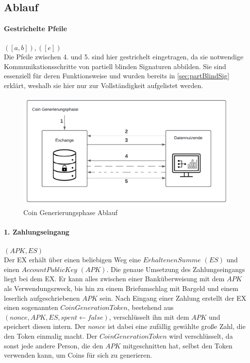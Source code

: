 \documentclass[
	fontsize=11pt,
	headings=small,
	parskip=half,           %
	bibliography=totoc,
	numbers=noenddot,       %
	open=any,               %
]{scrreprt}
\begin{document}
\subsection{Ablauf}

\paragraph*{Gestrichelte Pfeile} $([a,b]), ([e])$\\
Die Pfeile zwischen 4. und 5. sind hier gestrichelt eingetragen, da sie notwendige Kommunikationsschritte von partiell blinden Signaturen abbilden. Sie sind essenziell für deren Funktionsweise und wurden bereits in \ref{sec:partBlindSig} erklärt, weshalb sie hier nur zur Vollständigkeit aufgelistet werden.

\begin{figure}[H]
    \centering
    \includegraphics[width=0.7\linewidth]{CoinGenerationPhaseDiagramm.pdf}
    \caption{Coin Generierungsphase Ablauf}
    \label{fig:coin-generationphase}
\end{figure}

\paragraph{1. Zahlungseingang} $(APK, ES)$\\
Der EX erhält über einen beliebigen Weg eine $ErhaltenenSumme$ $(ES)$ und einen $AccountPublicKey$ $(APK)$. Die genaue Umsetzung des Zahlungseingangs liegt bei dem EX. Er kann alles zwischen einer Banküberweisung mit dem $APK$ als Verwendungszweck, bis hin zu einem Briefumschlag mit Bargeld und einem leserlich aufgeschriebenen $APK$ sein. Nach Eingang einer Zahlung erstellt der EX einen sogenannten $CoinGenerationToken$, bestehend aus $(nonce, APK, ES, spent \leftarrow false)$, verschlüsselt ihn mit dem $APK$ und speichert diesen intern. Der $nonce$ ist dabei eine zufällig gewählte große Zahl, die den Token einmalig macht. Der $CoinGenerationToken$ wird verschlüsselt, da sonst jede andere Person, die den $APK$ mitgeschnitten hat, selbst den Token verwenden kann, um Coins für sich zu generieren.
\end{document}

